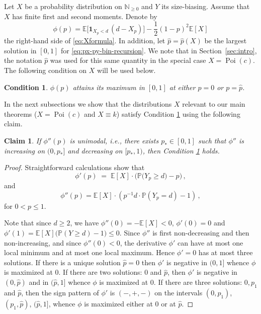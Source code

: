 \documentclass[reqno,english]{amsart}
\numberwithin{equation}{section}
\newtheorem{claim}[theorem]{Claim}
\newtheorem{condition}[theorem]{Condition}
\theoremstyle{definition}{
\newtheorem{example}[theorem]{Example}
\newtheorem{definition}[theorem]{Definition}
\newtheorem*{definition*}{Definition}
\newtheorem{problem}[theorem]{Problem}
\newtheorem{question}[theorem]{Question}
}
\newcommand{\E}{\mathbb E}
\newcommand{\N}{\mathbb N}
\renewcommand{\P}{\mathbb P}
\begin{document}
Let $X$ be a probability distribution on $\N_{\ge 0}$ and $Y$ its size-biasing. 
Assume that $X$ has finite first and second moments. Denote by
\[
\phi(p)=\E\big[\mathbf 1_{X_p<d}\,(d-X_p)\big]-\frac12(1-p)^2\E[X]
\]
the right-hand side of \eqref{eq:Xformula}. In addition, let $\hat p=\hat p(X)$ be the largest solution in $[0,1]$ for \eqref{eq:px-py-bin-recursion}. We note that in Section~\ref{sec:intro}, the notation \(\hat p\) was used
for this same quantity in the special case \(X=\operatorname{Poi}(c)\). The following condition on \(X\) will be used below.

\begin{condition}\label{ass:max_phi}
    $\phi(p)$ attains its maximum in $[0,1]$ at either $p=0$ or $p=\hat p$.
\end{condition}

In the next subsections we show that the distributions $X$ relevant to our main theorems ($X=\operatorname{Poi}(c)$ and $X\equiv k$) satisfy Condition \ref{ass:max_phi} using the following claim.

\begin{claim}\label{clm:max_phi}
    If $\phi''(p)$ is unimodal, i.e., there exists $p_*\in[0,1]$ such that $\phi''$ is increasing on $(0,p_*]$
and decreasing on $[p_*,1)$, then Condition \ref{ass:max_phi} holds.
\end{claim}
\begin{proof}
Straightforward calculations show that
\[
\phi'(p)\;=\;\E[X]\cdot\Big(\P\big(Y_p\ge d\big)-p\Big)\,,
\]
and
\begin{equation}\label{eq:phi''}
\phi''(p)
=
\E[X]\cdot\left(p^{-1}d\cdot \P(Y_p=d)-1\right)\,,
\end{equation}
for $0<p\le 1$.

     Note that since $d\ge 2$, we have $\phi''(0)=-\E[X]<0$, $\phi'(0)=0$ and $\phi'(1)=\E[X]\big(\P(Y\ge d)-1\big)\le 0$. Since $\phi''$ is first non-decreasing and then non-increasing, and since
$\phi''(0)<0$, the derivative $\phi'$ can have at most one local minimum
and at most one local maximum. Hence $\phi'=0$ has at most three solutions. If there is a unique solution $\hat p =0$ then $\phi'$ is negative in $(0,1]$ whence $\phi$ is maximized at $0$. If there are two solutions: $0$ and $\hat p$, then $\phi'$ is negative in $(0,\hat p)$ and in $(\hat p,1]$ whence $\phi$ is maximized at $0$. If there are three solutions: $0,p_1$ and $\hat p$, then the sign pattern of $\phi'$ is $(-,+,-)$ on the intervals $(0,p_1)$, $(p_1,\hat p)$, $(\hat p,1]$, whence $\phi$ is maximized either at $0$ or at $\hat p$.
\end{proof}
\end{document}
